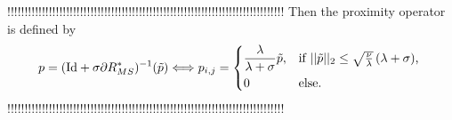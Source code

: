         !!!!!!!!!!!!!!!!!!!!!!!!!!!!!!!!!!!!!!!!!!!!!!!!!!!!!!!!!!!!!!!!!!!!!!!!!!!!!!!!
        Then the proximity operator is defined by
            \begin{equation}
                p = (\textnormal{Id} + \sigma \partial R_{MS}^{\ast})^{-1}(\tilde{p}) \Longleftrightarrow p_{i,j} =
                    \begin{dcases*}
                        \frac{\lambda}{\lambda + \sigma} \tilde{p}, & \textnormal{if $||\tilde{p}||_{2} \le \sqrt{\frac{\nu}{\lambda}} \, (\lambda + \sigma)$,} \\
                        0 & \textnormal{else.}
                    \end{dcases*}
                \label{eq:proximity_operator_f_star}
            \end{equation}
        !!!!!!!!!!!!!!!!!!!!!!!!!!!!!!!!!!!!!!!!!!!!!!!!!!!!!!!!!!!!!!!!!!!!!!!!!!!!!!!!

